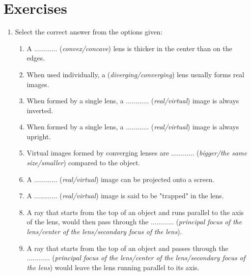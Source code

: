 \section{Exercises}
\begin{enumerate}
\item{Select the correct answer from the options given:
\begin{enumerate}
\item A $\ldots\ldots\ldots\ldots$ (\textit{convex/concave}) lens is thicker in the center than on the edges.
\item When used individually, a (\textit{diverging/converging}) lens usually forms real images.
\item When formed by a single lens, a $\ldots\ldots\ldots\ldots$ (\textit{real/virtual}) image is always inverted.
\item When formed by a single lens, a $\ldots\ldots\ldots\ldots$ (\textit{real/virtual}) image is always upright.
\item Virtual images formed by converging lenses are $\ldots\ldots\ldots\ldots$ (\textit{bigger/the same size/smaller}) compared to the object.
\item A $\ldots\ldots\ldots\ldots$ (\textit{real/virtual}) image can be projected onto a screen.
\item A $\ldots\ldots\ldots\ldots$ (\textit{real/virtual}) image is said to be "trapped" in the lens.
\item A ray that starts from the top of an object and runs parallel to the axis of the lens, would then pass through the $\ldots\ldots\ldots\ldots$ (\textit{principal focus of the lens/center of the lens/secondary focus of the lens}).
\item A ray that starts from the top of an object and passes through the $\ldots\ldots\ldots\ldots$ (\textit{principal focus of the lens/center of the lens/secondary focus of the lens}) would leave the lens running parallel to its axis.

\end{enumerate}}
\end{enumerate}

